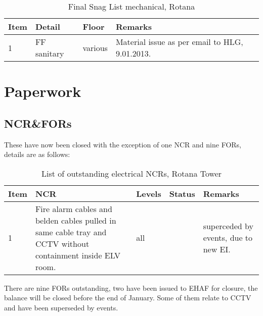\begin{table}[htbp]
\begin{tabular}{lllp{4.5cm}}
\toprule
Item &Detail &Floor  & Remarks\\
\midrule
1 &FF sanitary &various & Material issue as per email to HLG, 9.01.2013. \\
\bottomrule
\end{tabular}
\caption{Final Snag List mechanical, Rotana}

\end{table}


\section{Paperwork}

\subsection{NCR\&FORs}

These have now been closed with the exception of one NCR and nine FORs, details are as follows:

\begin{table}[htbp]
\small
\begin{tabular}{lp{3.5cm}llp{2.5cm}}
\toprule
Item &NCR & Levels & Status &Remarks\\ 
\midrule
1    &Fire alarm cables and belden cables pulled in same cable tray and CCTV without containment inside ELV room. 
& all & &superceded by events, due to new EI.\\
\bottomrule
\end{tabular}
\caption{List of outstanding electrical NCRs, Rotana Tower}
\end{table}

There are nine FORs outstanding, two have been issued to EHAF for closure, the balance will be closed before the end of January. Some of them relate to CCTV and have been superseded by events. 














